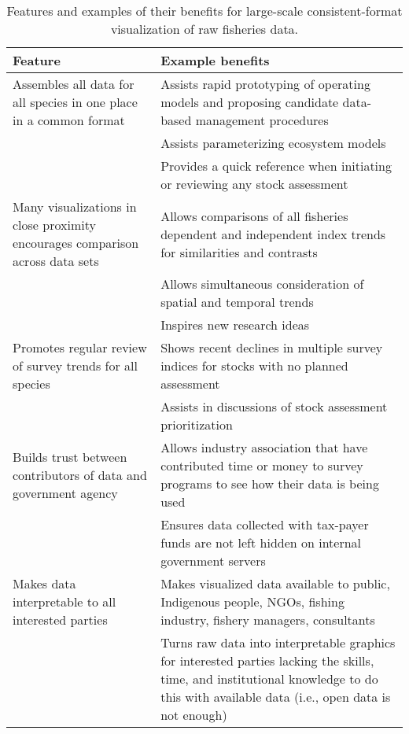 \documentclass[12pt,]{article}
\begin{document}
\clearpage

\begin{table}

\caption{\label{tab:benefits}Features and examples of their benefits for large-scale consistent-format visualization of raw fisheries data.}
\centering
\begin{tabular}[t]{>{\raggedright\arraybackslash}p{6.0cm}>{\raggedright\arraybackslash}p{10cm}}
\toprule
Feature & Example benefits\\
\midrule
Assembles all data for all species in one place in a common format & Assists rapid prototyping of operating models and proposing candidate data-based management procedures\\
\addlinespace
 & Assists parameterizing ecosystem models\\
\addlinespace
 & Provides a quick reference when initiating or reviewing any stock assessment\\
\addlinespace
Many visualizations in close proximity encourages comparison across data sets & Allows comparisons of all fisheries dependent and independent index trends for
similarities and contrasts\\
\addlinespace
 & Allows simultaneous consideration of spatial and temporal trends\\
\addlinespace
 & Inspires new research ideas\\
\addlinespace
Promotes regular review of survey trends for all species & Shows recent declines in multiple survey indices for stocks with no planned assessment\\
\addlinespace
 & Assists in discussions of stock assessment prioritization\\
\addlinespace
Builds trust between contributors of data and government agency & Allows industry association that have contributed time or money to survey programs to see how their data is being used\\
\addlinespace
 & Ensures data collected with tax-payer funds are not left hidden on internal government servers\\
\addlinespace
Makes data interpretable to all interested parties & Makes visualized data available to public, Indigenous people, NGOs, fishing industry, fishery managers, consultants\\
\addlinespace
 & Turns raw data into interpretable graphics for interested parties lacking the skills, time, and institutional knowledge to do this with available data (i.e., open data is not enough)\\

\end{tabular}
\end{table}
\end{document}
